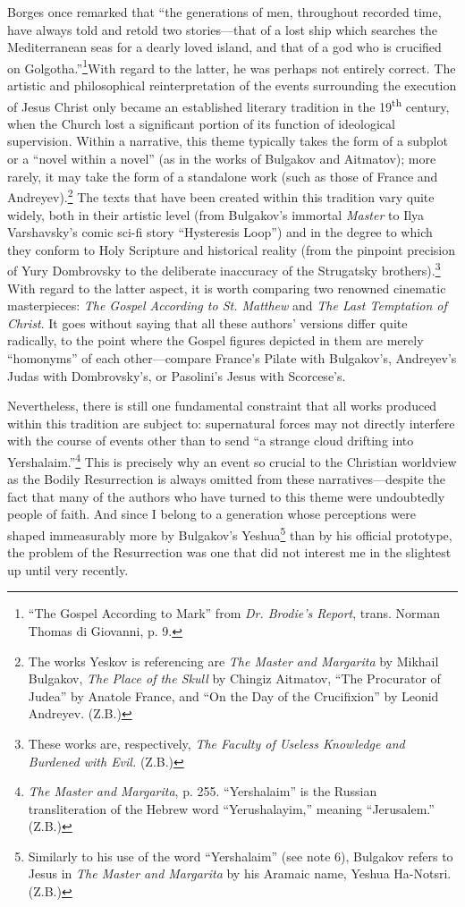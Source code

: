 Borges once remarked that ``the generations of men, throughout recorded time, have always told and retold two stories---that of a lost ship which searches the Mediterranean seas for a dearly loved island, and that of a god who is crucified on Golgotha.''\footnote{
``The Gospel According to Mark'' from \emph{Dr. Brodie's Report}, trans. Norman Thomas di Giovanni, p. 9.}With regard to the latter, he was perhaps not entirely correct. The artistic and philosophical reinterpretation of the events surrounding the execution of Jesus Christ only became an established literary tradition in the 19\textsuperscript{th} century, when the Church lost a significant portion of its function of ideological supervision. Within a narrative, this theme typically takes the form of a subplot or a ``novel within a novel'' (as in the works of Bulgakov and Aitmatov); more rarely, it may take the form of a standalone work (such as those of France and Andreyev).\footnote{The works Yeskov is referencing are \emph{The Master and Margarita} by Mikhail Bulgakov, \emph{The Place of the
Skull} by Chingiz Aitmatov, ``The Procurator of Judea'' by Anatole France, and ``On the Day of the
Crucifixion'' by Leonid Andreyev. (Z.B.)} The texts that have been created within this tradition vary quite widely, both in their artistic level (from Bulgakov's immortal \emph{Master} to Ilya Varshavsky's comic sci-fi story ``Hysteresis Loop'') and in the degree to which they conform to Holy Scripture and historical reality (from the pinpoint precision of Yury Dombrovsky to the deliberate inaccuracy of the Strugatsky brothers).\footnote{These works are, respectively, \emph{The Faculty of Useless Knowledge and Burdened with Evil.} (Z.B.)} With regard to the latter aspect, it is worth comparing two renowned cinematic masterpieces: \emph{The Gospel According to St. Matthew} and \emph{The Last Temptation of Christ}. It goes without saying that all these authors' versions differ quite radically, to the point where the Gospel figures depicted in them are merely ``homonyms'' of each other---compare France's Pilate with Bulgakov's, Andreyev's Judas with Dombrovsky's, or Pasolini's Jesus with Scorcese's.

Nevertheless, there is still one fundamental constraint that all works produced within this tradition are subject to: supernatural forces may not directly interfere with the course of events other than to send ``a strange cloud drifting into Yershalaim.''\footnote{\emph{The Master and Margarita}, p. 255. ``Yershalaim'' is the Russian transliteration of the Hebrew word ``Yerushalayim,'' meaning ``Jerusalem.'' (Z.B.)} This is precisely why an event so crucial to the Christian worldview as the Bodily Resurrection is always omitted from these narratives---despite the fact that many of the authors who have turned to this theme were undoubtedly people of faith. And since I belong to a generation whose perceptions were shaped immeasurably more by Bulgakov's Yeshua\footnote{Similarly to his use of the word ``Yershalaim'' (see note 6), Bulgakov refers to Jesus in \emph{The Master and Margarita} by his Aramaic name, Yeshua Ha-Notsri. (Z.B.)} than by his official prototype, the problem of the Resurrection was one that did not interest me in the slightest up until very recently.